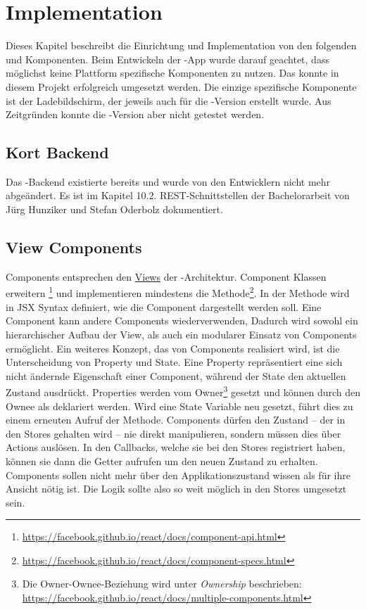 \chapter{Implementation}
\label{pd-implementation}
Dieses Kapitel beschreibt die Einrichtung und Implementation von den folgenden  und Komponenten. 
Beim Entwickeln der -App wurde darauf geachtet, dass möglichst keine Plattform spezifische Komponenten zu nutzen. 
Das konnte in diesem Projekt erfolgreich umgesetzt werden. 
Die einzige spezifische Komponente ist der Ladebildschirm, der jeweils auch für die -Version erstellt wurde.
Aus Zeitgründen konnte die -Version aber nicht getestet werden. 


\section{Kort Backend}
Das \kort{}-Backend existierte bereits und wurde von den Entwicklern nicht mehr abgeändert. 
Es ist im Kapitel 10.2. \gls{REST}-Schnittstellen der Bachelorarbeit von Jürg Hunziker und Stefan Oderbolz dokumentiert.\cite{ba-kort-2012}

\section{View Components}
Components entsprechen den \hyperref[pd-flux-views]{Views} der -Architektur.
Component Klassen erweitern \footnote{\url{https://facebook.github.io/react/docs/component-api.html}} und implementieren mindestens die  Methode\footnote{\url{https://facebook.github.io/react/docs/component-specs.html}}. 
In der  Methode wird in \gls{JSX} Syntax definiert, wie die Component dargestellt werden soll.\newline
Eine Component kann andere Components wiederverwenden,
Dadurch wird sowohl ein hierarchischer Aufbau der View, als auch ein modularer Einsatz von Components  ermöglicht.\newline
Ein weiteres Konzept, das von Components realisiert wird, ist die Unterscheidung von Property und State.
Eine Property repräsentiert eine sich nicht ändernde Eigenschaft einer Component, während der State den aktuellen Zustand ausdrückt.
Properties werden vom Owner\footnote{Die Owner-Ownee-Beziehung wird unter \emph{Ownership} beschrieben: \url{https://facebook.github.io/react/docs/multiple-components.html}} gesetzt und können durch den Ownee als  deklariert werden.
Wird eine State Variable neu gesetzt, führt dies zu einem erneuten Aufruf der  Methode.\newline
Components dürfen den Zustand -- der in den Stores gehalten wird -- nie direkt manipulieren, sondern müssen dies über Actions auslösen.
In den Callbacks, welche sie bei den Stores registriert haben, können sie dann die Getter aufrufen um den neuen Zustand zu erhalten.
Components sollen nicht mehr über den Applikationszustand wissen als für ihre Ansicht nötig ist.
Die Logik sollte also so weit möglich in den Stores umgesetzt sein.\newline


